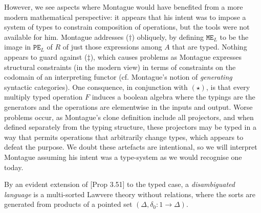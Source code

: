 However, we see aspects where Montague would have benefited from a more modern mathematical perspective: it appears that his intent was to impose a system of types to constrain composition of operations, but the tools were not available for him. Montague addresses ($\dag$) obliquely, by defining $\texttt{ME}_L$ to be the image in $\texttt{PE}_L$ of $R$ of just those expressions among $A$ that are typed. Nothing appears to guard against ($\ddag$), which causes problems as Montague expresses structural constraints (in the modern view) in terms of constraints on the codomain of an interpreting functor (cf. Montague's notion of \emph{generating} syntactic categories). One consquence, in conjunction with $(\star)$, is that every multiply typed operation $F$ induces a boolean algebra where the typings are the generators and the operations are elementwise in the inputs and output. Worse problems occur, as Montague's clone definition include all projectors, and when defined separately from the typing structure, these projectors may be typed in a way that permits operations that arbitrarily change types, which appears to defeat the purpose. We doubt these artefacts are intentional, so we will interpret Montague assuming his intent was a type-system as we would recognise one today.

By an evident extension of [Prop 3.51] to the typed case, a \emph{disambiguated language} is a multi-sorted Lawvere theory without relations, where the sorts are generated from products of a pointed set $(\Delta, \delta_0 : 1 \rightarrow \Delta)$.